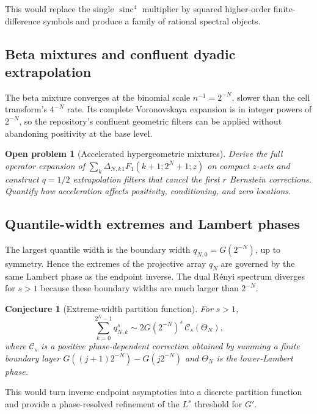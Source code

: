 \documentclass[11pt,oneside]{article}
\newtheorem{conjecture}[theorem]{Conjecture}
\newtheorem{openproblem}[theorem]{Open problem}
\theoremstyle{definition}
\theoremstyle{remark}
\newcommand{\sinc}{\operatorname{sinc}}
\begin{document}
This would replace the single $\sinc^4$ multiplier by squared higher-order
finite-difference symbols and produce a family of rational spectral objects.

\subsection{Beta mixtures and confluent dyadic extrapolation}

The beta mixture converges at the binomial scale $n^{-1}=2^{-N}$, slower than
the cell transform's $4^{-N}$ rate.  Its complete Voronovskaya expansion is in
integer powers of $2^{-N}$, so the repository's confluent geometric filters can
be applied without abandoning positivity at the base level.

\begin{openproblem}[Accelerated hypergeometric mixtures]
\label{op:beta-acceleration}
Derive the full operator expansion of
$\sum_k\Delta_{N,k}{}_1F_1(k+1;2^N+1;z)$ on compact $z$-sets and construct
$q=1/2$ extrapolation filters that cancel the first $r$ Bernstein corrections.
Quantify how acceleration affects positivity, conditioning, and zero locations.
\end{openproblem}

\subsection{Quantile-width extremes and Lambert phases}

The largest quantile width is the boundary width
$q_{N,0}=G(2^{-N})$, up to symmetry.  Hence the extremes of the projective array
$q_N$ are governed by the same Lambert phase as the endpoint inverse.
The dual R\'enyi spectrum diverges for $s>1$ because these boundary widths are
much larger than $2^{-N}$.

\begin{conjecture}[Extreme-width partition function]
\label{conj:q-width-partition}
For $s>1$,
\begin{equation}\label{eq:q-width-conj}
 \sum_{k=0}^{2^N-1}q_{N,k}^s
 \sim2G(2^{-N})^s\,\mathcal C_s(\Theta_N),
\end{equation}
where $\mathcal C_s$ is a positive phase-dependent correction obtained by
summing a finite boundary layer
$G((j+1)2^{-N})-G(j2^{-N})$ and $\Theta_N$ is the lower-Lambert phase.
\end{conjecture}

This would turn inverse endpoint asymptotics into a discrete partition function
and provide a phase-resolved refinement of the $L^s$ threshold for $G'$.
\end{document}
